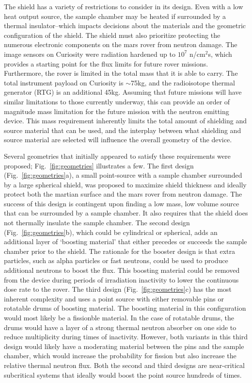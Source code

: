 \documentclass{mc2015}
\begin{document}
The shield has a variety of restrictions to consider in its design. Even with a low heat output source, the sample chamber may be heated if surrounded by a thermal insulator--which impacts decisions about the materials and the geometric configuration of the shield. The shield must also prioritize protecting the numerous electronic components on the mars rover from neutron damage. The image sensors on Curiosity were radiation hardened up to  $10^{7}$ n/cm$^2$s, which provides a starting point for the flux limits for future rover missions. Furthermore, the rover is limited in the total mass that it is able to carry. The total instrument payload on Curiosity is $\sim$75kg, and the radioisotope thermal generator (RTG) is an additional 45kg. Assuming that future missions will have similar limitations to those currently underway, this can provide an order of magnitude mass limitation for the future mission with the neutron emitting device. This mass requirement inherently limits the total amount of shielding and source material that can be used, and the interplay between what shielding and source material are selected will influence the overall geometry of the device. 

Several geometries that initially appeared to satisfy these requirements were proposed; Fig.\ \ref{fig:geometries} illustrates a few. The first design (Fig.\ \ref{fig:geometries}a), a small point-source with a sample chamber surrounded by a large spherical shield, was proposed to maximize shield thickness and ideally protect both the martian surface and the mars rover from neutron damage. The success of this design is contingent upon finding a low mass, low volume source that can be surrounded by a sample chamber. It also requires that the shield does not thermally insulate the sample chamber. The second design (Fig.\ \ref{fig:geometries}b), which could be cylindrical or spherical, adds an additional layer of `boosting material' that either precedes or succeeds the sample chamber prior to the shield. The rationale for the booster design is that extra particles, such as alpha particles or fast neutrons, could be used to produce additional neutrons to boost the flux. This boosting material could be removed from the device during periods of irradiation inactivity to lower the continuous dose rate to the rover. The third design (Fig.\ \ref{fig:geometries}c) has the most inherent complexity and uses a point source with either removable pins or rotatable drums of boosting material. The boosting material in this configuration would most likely be a fissionble material. In the case of rotatable drums, the drums would have a layer of a strong thermal neutron absorber on one side to reduce multiplicity during times of inactivity. However, both variants in this third design would likely have a moderating material between the pins and the sample chamber, which would increase the probability for fission but also increase the relative thermal neutron flux. Both the second and third designs are near-critical subcritical systems that ideally would boost the point source hundreds of times. 
\end{document}
